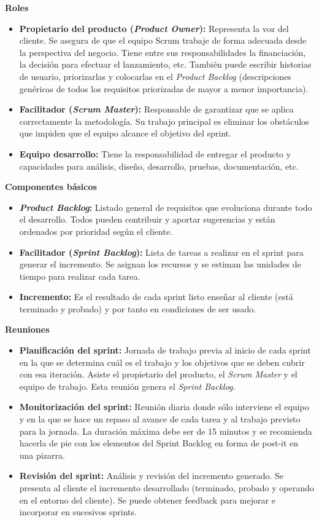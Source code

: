 \noindent
\textbf{Roles}
\begin{itemize}
\item \textbf{Propietario del producto (\textit{Product Owner}):} Representa la voz del cliente. Se asegura de que el equipo Scrum trabaje de forma adecuada desde la perspectiva del negocio. Tiene entre sus responsabilidades la financiación, la decisión para efectuar el lanzamiento, etc. También puede escribir historias de usuario, priorizarlas y colocarlas en el \textit{Product Backlog} (descripciones genéricas de todos los requisitos priorizadas de mayor a menor importancia).
\item \textbf{Facilitador (\textit{Scrum Master}):} Responsable de garantizar que se aplica correctamente la metodología. Su trabajo principal es eliminar los obstáculos que impiden que el equipo alcance el objetivo del sprint.
\item \textbf{Equipo desarrollo:} Tiene la responsabilidad de entregar el producto y capacidades para análisis, diseño, desarrollo, pruebas, documentación, etc.
\end{itemize}

\noindent
\textbf{Componentes básicos}
\begin{itemize}
\item \textbf{\textit{Product Backlog}:} Listado general de requisitos que evoluciona durante todo el desarrollo. Todos pueden contribuir y aportar sugerencias y están ordenados por prioridad según el cliente.
\item \textbf{Facilitador (\textit{Sprint Backlog}):} Lista de tareas a realizar en el sprint para generar el incremento. Se asignan los recursos y se estiman las unidades de tiempo para realizar cada tarea.
\item \textbf{Incremento:} Es el resultado de cada sprint listo enseñar al cliente (está terminado y probado) y por tanto en condiciones de ser usado.
\end{itemize}

\noindent
\textbf{Reuniones}
\begin{itemize}
\item \textbf{Planificación del sprint:} Jornada de trabajo previa al inicio de cada sprint en la que se determina cuál es el trabajo y los objetivos que se deben cubrir con esa iteración. Asiste el propietario del producto, el \textit{Scrum Master} y el equipo de trabajo. Esta reunión genera el \textit{Sprint Backlog}.
\item \textbf{Monitorización del sprint:} Reunión diaria donde sólo interviene el equipo y en la que se hace un repaso al avance de cada tarea y al trabajo previsto para la jornada. La duración máxima debe ser de 15 minutos y se recomienda hacerla de pie con los elementos del Sprint Backlog en forma de post-it en una pizarra.
\item \textbf{Revisión del sprint:} Análisis y revisión del incremento generado. Se presenta al cliente el incremento desarrollado (terminado, probado y operando en el entorno del cliente). Se puede obtener feedback para mejorar e incorporar en sucesivos sprints.
\end{itemize}

